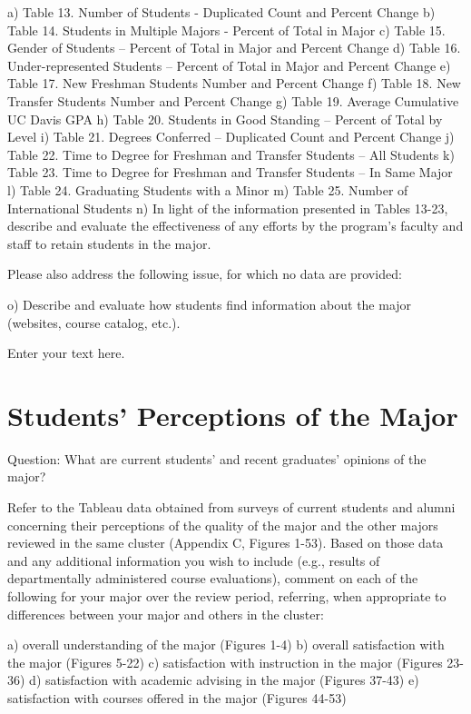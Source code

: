 \documentclass[12pt]{article}
\begin{document}
    a) Table 13.  Number of Students - Duplicated Count and Percent Change 
    b) Table 14.  Students in Multiple Majors - Percent of Total in Major 
    c) Table 15.  Gender of Students – Percent of Total in Major and Percent Change 
    d) Table 16.  Under-represented Students – Percent of Total in Major and Percent Change 
    e) Table 17.  New Freshman Students Number and Percent Change 
    f) Table 18.  New Transfer Students Number and Percent Change 
    g) Table 19.  Average Cumulative UC Davis GPA 
    h) Table 20.  Students in Good Standing – Percent of Total by Level 
    i) Table 21.  Degrees Conferred – Duplicated Count and Percent Change 
    j) Table 22.  Time to Degree for Freshman and Transfer Students – All Students 
    k) Table 23.  Time to Degree for Freshman and Transfer Students – In Same Major 
    l) Table 24.  Graduating Students with a Minor
    m) Table 25.  Number of International Students
    n) In light of the information presented in Tables 13-23, describe and evaluate the effectiveness of any efforts by the program’s faculty and staff to retain students in the major.

Please also address the following issue, for which no data are provided:

    o) Describe and evaluate how students find information about the major (websites, course catalog, etc.).

Enter your text here.


\section{Students’ Perceptions of the Major}
Question: What are current students’ and recent graduates’ opinions of the major?

Refer to the Tableau data obtained from surveys of current students and alumni concerning their perceptions of the quality of the major and the other majors reviewed in the same cluster (Appendix C, Figures 1-53). Based on those data and any additional information you wish to include (e.g., results of departmentally administered course evaluations), comment on each of the following for your major over the review period, referring, when appropriate to differences between your major and others in the cluster:

    a) overall understanding of the major (Figures 1-4)
    b) overall satisfaction with the major (Figures 5-22)
    c) satisfaction with instruction in the major (Figures 23-36)
    d) satisfaction with academic advising in the major (Figures 37-43)
    e) satisfaction with courses offered in the major (Figures 44-53)
\end{document}
